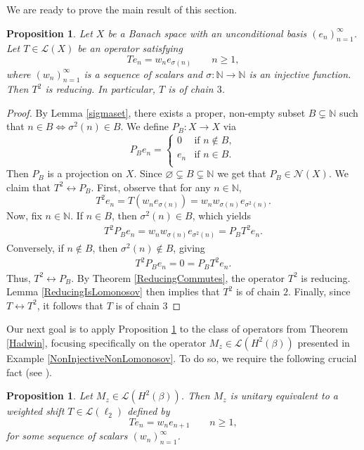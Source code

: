 \documentclass[a4paper,12pt]{article}
\newtheorem{prop}[thm]{Proposition}
\theoremstyle{definition}
\numberwithin{equation}{section}
\numberwithin{thm}{section}
\newcommand{\N}{\mathbb{N}}
\begin{document}
We are ready to prove the main result of this section.
\begin{prop}
\label{Chain4Main}
Let $X$ be a Banach space with an unconditional basis $(e_n)_{n=1}^\infty$. Let $T\in \mathcal{L}(X)$ be an operator satisfying
$$Te_n = w_n e_{\sigma(n)} \qquad n\geq 1,$$
where $(w_n)_{n=1}^\infty$ is a sequence of scalars and $\sigma:\N\rightarrow \N$ is an injective function. Then $T^2$ is reducing. In particular, $T$ is of chain $3$. 
\end{prop}
\begin{proof}
By Lemma \ref{sigmaset}, there exists a proper, non-empty subset $B \subsetneq \N$ such that $n\in B \iff \sigma^2(n)\in B$. 
We define $P_B : X \rightarrow X$ via
$$
P_B e_n = 
     \begin{cases}
       0 &\text{if } n \notin B,\\
       e_n &\text{if } n\in B.\\
     \end{cases}
$$
Then $P_B$ is a projection on $X$. Since $\varnothing \subsetneq B \subsetneq \N$ we get that $P_B \in \mathcal{N}(X)$. We claim that $T^2 \leftrightarrow P_B$. First, observe that for any $n\in \N$,
$$T^2 e_n = T(w_n e_{\sigma(n)}) = w_nw_{\sigma(n)}e_{\sigma^2(n)}.$$
Now, fix $n \in \N$. If $n\in B$, then $\sigma^2(n)\in B$, which yields
\begin{align*}
T^2P_B e_n = w_nw_{\sigma(n)}e_{\sigma^2(n)} = P_B T^2 e_n.
\end{align*}
Conversely, if $n\notin B$, then $\sigma^2(n)\notin B$, giving
\begin{align*}
T^2P_B e_n = 0 = P_B T^2 e_n.
\end{align*}
Thus, $T^2 \leftrightarrow P_B$. By Theorem \ref{ReducingCommutes}, the operator $T^2$ is reducing. Lemma \ref{ReducingIsLomonosov} then implies that $T^2$ is of chain $2$. Finally, since $T \leftrightarrow T^2$, it follows that $T$ is of chain $3$
\end{proof}

Our next goal is to apply Proposition \ref{Chain4Main} to the class of operators from Theorem \ref{Hadwin}, focusing specifically on the operator $M_z\in \mathcal{L}(H^2(\beta))$ presented in Example \ref{NonInjectiveNonLomonosov}. To do so, we require the following crucial fact (see \cite[Section II, Proposition 7]{Shields}).

\begin{prop}
\label{UnitaryEquivalence}
Let $M_z \in \mathcal{L}(H^2(\beta))$. Then $M_z$ is unitary equivalent to a weighted shift $T\in \mathcal{L}(\ell_2)$ defined by
$$Te_n = w_n e_{n+1} \qquad n\geq 1,$$
for some sequence of scalars $(w_n)_{n=1}^\infty$. 
\end{prop}
\end{document}
